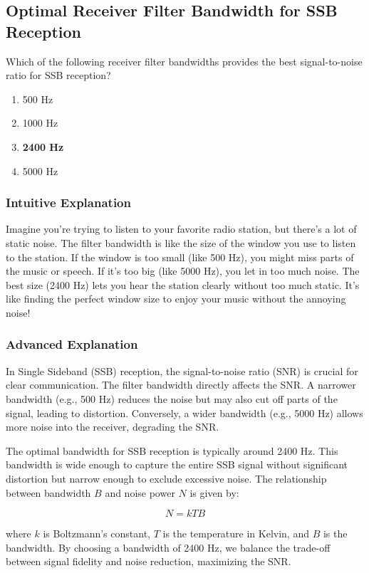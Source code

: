 \subsection{Optimal Receiver Filter Bandwidth for SSB Reception}
\label{T4B10}

\begin{tcolorbox}[colback=gray!10!white,colframe=black!75!black,title=T4B10]
Which of the following receiver filter bandwidths provides the best signal-to-noise ratio for SSB reception?
\begin{enumerate}[label=\Alph*)]
    \item 500 Hz
    \item 1000 Hz
    \item \textbf{2400 Hz}
    \item 5000 Hz
\end{enumerate}
\end{tcolorbox}

\subsubsection{Intuitive Explanation}
Imagine you're trying to listen to your favorite radio station, but there's a lot of static noise. The filter bandwidth is like the size of the window you use to listen to the station. If the window is too small (like 500 Hz), you might miss parts of the music or speech. If it's too big (like 5000 Hz), you let in too much noise. The best size (2400 Hz) lets you hear the station clearly without too much static. It's like finding the perfect window size to enjoy your music without the annoying noise!

\subsubsection{Advanced Explanation}
In Single Sideband (SSB) reception, the signal-to-noise ratio (SNR) is crucial for clear communication. The filter bandwidth directly affects the SNR. A narrower bandwidth (e.g., 500 Hz) reduces the noise but may also cut off parts of the signal, leading to distortion. Conversely, a wider bandwidth (e.g., 5000 Hz) allows more noise into the receiver, degrading the SNR.

The optimal bandwidth for SSB reception is typically around 2400 Hz. This bandwidth is wide enough to capture the entire SSB signal without significant distortion but narrow enough to exclude excessive noise. The relationship between bandwidth \( B \) and noise power \( N \) is given by:

\[ N = kTB \]

where \( k \) is Boltzmann's constant, \( T \) is the temperature in Kelvin, and \( B \) is the bandwidth. By choosing a bandwidth of 2400 Hz, we balance the trade-off between signal fidelity and noise reduction, maximizing the SNR.

